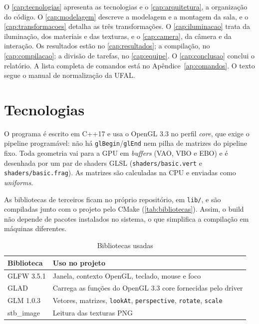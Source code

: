 \documentclass[
  12pt,          %
  oneside,       %
  a4paper,       %
  chapter=TITLE, %
  english,
  brazil,        %
]{abntex2}
\newcommand{\fonteautores}{\fonte{Elaborado pelos autores (2026).}}
\begin{document}
O \autoref{cap:tecnologias} apresenta as tecnologias e o \autoref{cap:arquitetura}, a organização do código.
O \autoref{cap:modelagem} descreve a modelagem e a montagem da sala, e o \autoref{cap:transformacoes}
detalha as três transformações. O \autoref{cap:iluminacao} trata da iluminação, dos materiais e das texturas, e o
\autoref{cap:camera}, da câmera e da interação. Os resultados estão no \autoref{cap:resultados}; a compilação,
no \autoref{cap:compilacao}; a divisão de tarefas, no \autoref{cap:equipe}. O \autoref{cap:conclusao} conclui
o relatório. A lista completa de comandos está no Apêndice~\ref{ap:comandos}. O texto segue o manual de
normalização da UFAL.

\chapter{Tecnologias}
\label{cap:tecnologias}

O programa é escrito em C++17 e usa o OpenGL 3.3 no perfil \emph{core}, que exige o
pipeline programável: não há \texttt{glBegin}/\texttt{glEnd} nem pilha de matrizes do pipeline fixo. Toda
geometria vai para a GPU em \emph{buffers} (VAO, VBO e EBO) e é desenhada por um par de shaders GLSL
(\texttt{shaders/basic.vert} e \texttt{shaders/basic.frag}). As matrizes são calculadas na CPU e enviadas
como \emph{uniforms}.

As bibliotecas de terceiros ficam no próprio repositório, em \texttt{lib/}, e são compiladas junto com o
projeto pelo CMake (\autoref{tab:bibliotecas}). Assim, o build não depende de pacotes instalados no sistema,
o que simplifica a compilação em máquinas diferentes.

\begin{table}[htb]
  \centering
  \caption{Bibliotecas usadas}
  \label{tab:bibliotecas}
  \small
  \begin{tabularx}{\textwidth}{|l|X|}
    \hline
    \textbf{Biblioteca} & \textbf{Uso no projeto} \\
    \hline
    GLFW 3.5.1 & Janela, contexto OpenGL, teclado, mouse e foco \\
    GLAD & Carrega as funções do OpenGL 3.3 core fornecidas pelo driver \\
    GLM 1.0.3 & Vetores, matrizes, \texttt{lookAt}, \texttt{perspective}, \texttt{rotate}, \texttt{scale} \\
    stb\_image & Leitura das texturas PNG \\
    \hline
  \end{tabularx}
  \fonteautores
\end{table}
\end{document}
